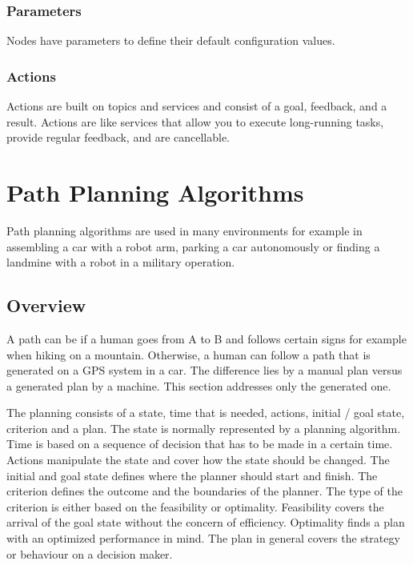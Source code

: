 \subsubsection{Parameters}
Nodes have parameters to define their default configuration values. %

\subsubsection{Actions}
Actions are built on topics and services and consist of a goal, feedback, and a result. Actions are like services that allow you to execute long-running tasks, provide regular feedback, and are cancellable. %

\section{Path Planning Algorithms}
Path planning algorithms are used in many environments for example in assembling a car with a robot arm, parking a car autonomously or finding a landmine with a robot in a military operation. 

\subsection{Overview}
A path can be if a human goes from A to B and follows certain signs for example when hiking on a mountain. Otherwise, a human can follow a path that is generated on a GPS system in a car. The difference lies by a manual plan versus a generated plan by a machine. This section addresses only the generated one.

The planning consists of a state, time that is needed, actions, initial / goal state, criterion and a plan. The state is normally represented by a planning algorithm. Time is based on a sequence of decision that has to be made in a certain time. Actions manipulate the state and cover how the state should be changed. The initial and goal state defines where the planner should start and finish.
The criterion defines the outcome and the boundaries of the planner. The type of the criterion is either based on the feasibility or optimality. Feasibility covers the arrival of the goal state without the concern of efficiency. Optimality finds a plan with an optimized performance in mind. The plan in general covers the strategy or behaviour on a decision maker.
\cite{planning_algorithms_steven_m_lavalle}

